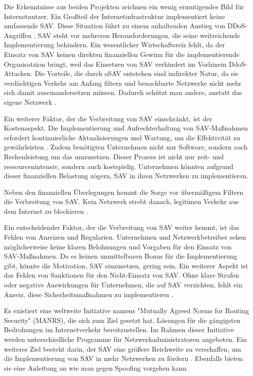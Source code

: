 \documentclass[sigplan,screen]{acmart}
\begin{document}
Die Erkenntnisse aus beiden Projekten zeichnen ein wenig ermutigendes Bild für Internetnutzer. Ein Großteil der Internetinfrastruktur implementiert keine umfassende SAV. Diese Situation führt zu einem anhaltenden Anstieg von DDoS-Angriffen \cite{CRP01}. SAV steht vor mehreren Herausforderungen, die seine weitreichende Implementierung behindern. 
Ein wesentlicher Wirtschaftsreiz fehlt, da der Einsatz von SAV keinen direkten finanziellen Gewinn für die implementierende Organisatzion bringt, weil das Einsetzen von SAV verhindert im Vorhinein DdoS-Attacken. Die Vorteile, die durch oSAV entstehen sind indirekter Natur, da sie verdächtigen Verkehr am Anfang filtern und benachbarte Netzwerke nicht mehr sich damit auseinandersetzen müssen. Dadurch schützt man andere, anstatt das eigene Netzwerk \cite{CRP01}.

Ein weiterer Faktor, der die Verbreitung von SAV einschränkt, ist der Kostenaspekt. Die Implementierung und Aufrechterhaltung von SAV-Maßnahmen erfordert kontinuierliche Aktualisierungen und Wartung, um die Effektivität zu gewährleisten \cite{Lone01}. Zudem benötigten Unternehmen nicht nur Software, sondern auch Rechenleistung um das umzusetzen. Dieser Prozess ist nicht nur zeit- und ressourcenintensiv, sondern auch kostspielig. Unternehmen könnten aufgrund dieser finanziellen Belastung zögern, SAV in ihren Netzwerken zu implementieren.

Neben den finanziellen Überlegungen hemmt die Sorge vor übermäßigem Filtern die Verbreitung von SAV. Kein Netzwerk strebt danach, legitimen Verkehr aus dem Internet zu blockieren \cite{FrontDoor01}.

Ein entscheidender Faktor, der die Verbreitung von SAV weiter hemmt, ist das Fehlen von Anreizen und Regularien. Unternehmen und Netzwerkbetreiber sehen möglicherweise keine klaren Belohnungen und Vorgaben für den Einsatz von SAV-Maßnahmen. Da es keinen unmittelbaren Bonus für die Implementierung gibt, könnte die Motivation, SAV einzusetzen, gering sein. Ein weiterer Aspekt ist das Fehlen von Sanktionen für den Nicht-Einsatz von SAV. Ohne klare Strafen oder negative Auswirkungen für Unternehmen, die auf SAV verzichten, fehlt ein Anreiz, diese Sicherheitsmaßnahmen zu implementieren \cite{Lone01}.

Es existiert eine weltweite Initiative namens "Mutually Agreed Norms for Routing Security" (MANRS), die sich zum Ziel gesetzt hat, Lösungen für die gängigsten Bedrohungen im Internetverkehr bereitzustellen. Im Rahmen dieser Initiative werden unterschiedliche Programme für Netzwerkadministratoren angeboten. Ein weiteres Ziel besteht darin, der SAV eine größere Reichweite zu verschaffen, um die Implementierung von SAV in mehr  Netzwerken zu fördern \cite{manrs01}. Ebenfalls bieten sie eine Anleitung \cite{anti-spoofing01} an wie man gegen Spoofing vorgehen kann.
\end{document}
